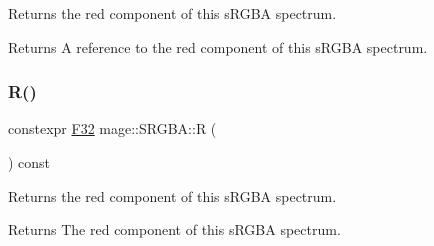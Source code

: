 Returns the red component of this s\+R\+G\+BA spectrum.

\begin{DoxyReturn}{Returns}
A reference to the red component of this s\+R\+G\+BA spectrum. 
\end{DoxyReturn}
\mbox{\label{structmage_1_1_s_r_g_b_a_a0b291da740acf9f6b79c0faf5bbf3f10}} 
\subsubsection{\texorpdfstring{R()}{R()}\hspace{0.1cm}{\footnotesize\ttfamily [2/2]}}
{\footnotesize\ttfamily constexpr \mbox{\hyperlink{namespacemage_aa97e833b45f06d60a0a9c4fc22ae02c0}{F32}} mage\+::\+S\+R\+G\+B\+A\+::R (\begin{DoxyParamCaption}{ }\end{DoxyParamCaption}) const\hspace{0.3cm}{\ttfamily [noexcept]}}

Returns the red component of this s\+R\+G\+BA spectrum.

\begin{DoxyReturn}{Returns}
The red component of this s\+R\+G\+BA spectrum. 
\end{DoxyReturn}

